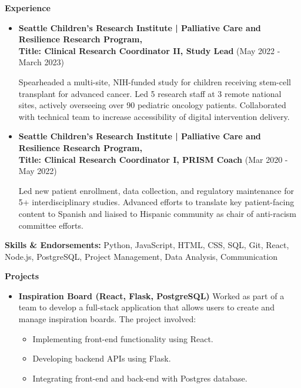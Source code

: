 \documentclass[a4paper,10pt]{article}
\begin{document}
\noindent
\textbf{Experience}
\begin{itemize}[noitemsep,topsep=0pt,parsep=0pt,partopsep=0pt,itemsep=2pt,after=\vspace{\baselineskip}]
\item \textbf{Seattle Children’s Research Institute | Palliative Care and Resilience Research Program,} \\
\textbf{Title: Clinical Research Coordinator II, Study Lead} (May 2022 - March 2023)

Spearheaded a multi-site, NIH-funded study for children receiving stem-cell transplant for advanced cancer. Led 5 research staff at 3 remote national sites, actively overseeing over 90 pediatric oncology patients. Collaborated with technical team to increase accessibility of digital intervention delivery.

\vspace{8pt}

\item \textbf{Seattle Children’s Research Institute | Palliative Care and Resilience Research Program,} \\
\textbf{Title: Clinical Research Coordinator I, PRISM Coach} (Mar 2020 - May 2022)

Led new patient enrollment, data collection, and regulatory maintenance for 5+ interdisciplinary studies. Advanced efforts to translate key patient-facing content to Spanish and liaised to Hispanic community as chair of anti-racism committee efforts.
\end{itemize}

\vspace{8pt}

\noindent
\textbf{Skills \& Endorsements:} Python, JavaScript, HTML, CSS, SQL, Git, React, Node.js, PostgreSQL, Project Management, Data Analysis, Communication\\

\vspace{8pt}

\noindent
\textbf{Projects}
\begin{itemize}[noitemsep,topsep=0pt,parsep=0pt,partopsep=0pt,itemsep=2pt]
\item \textbf{Inspiration Board (React, Flask, PostgreSQL)} Worked as part of a team to develop a full-stack application that allows users to create and manage inspiration boards. The project involved:

\begin{itemize}[noitemsep,topsep=0pt,parsep=0pt,partopsep=0pt,itemsep=2pt]
\item Implementing front-end functionality using React.
\item Developing backend APIs using Flask.
\item Integrating front-end and back-end with Postgres database.
\end{itemize}
\end{itemize}
\end{document}
